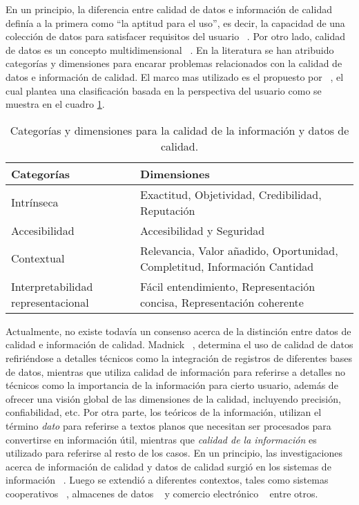 En un principio, la diferencia entre calidad de datos e informaci\'on de calidad defin\'ia a la primera como ``la aptitud para el uso'', es decir, la capacidad de una colecci\'on de datos para satisfacer requisitos del usuario  ~\cite{StroD:97, CappC:02}. Por otro lado, calidad de datos es un concepto multidimensional ~\cite{CappC:02}. En la literatura se han atribuido categor\'ias y dimensiones para encarar problemas relacionados con la calidad de datos e informaci\'on de calidad. El marco mas utilizado es el propuesto por ~\cite{StroD:97}, el cual plantea una clasificaci\'on basada en la perspectiva del usuario como se muestra en el cuadro \ref{table:tablacidc1}.

\begin{table}[h]
  \centering
   \renewcommand{\arraystretch}{2}
   \begin{tabular}{>{\arraybackslash}m{3cm} >{\arraybackslash}m{10cm}}
	   \hline
	   \textbf{Categor\'ias} & \textbf{Dimensiones} \\
	   \hline
	   Intr\'inseca & Exactitud, Objetividad, Credibilidad, Reputaci\'on \\
	   Accesibilidad & Accesibilidad y Seguridad  \\
	   Contextual &  Relevancia, Valor a\~nadido, Oportunidad, Completitud, Informaci\'on Cantidad \\
	   Interpretabilidad representacional & F\'acil entendimiento, Representaci\'on concisa, Representaci\'on coherente  \\
\hline
 \end{tabular}
\caption {Categor\'ias y dimensiones para la calidad de la informaci\'on y datos de calidad.}
\label{table:tablacidc1}
\end{table}

Actualmente, no existe todav\'ia un consenso acerca de la distinci\'on entre datos de calidad e informaci\'on de calidad. Madnick ~\cite{MadWanLeeZhu:09}, determina el uso de calidad de datos refiri\'endose a detalles t\'ecnicos como la integraci\'on de registros de diferentes bases de datos, mientras que utiliza calidad de informaci\'on para referirse a detalles no t\'ecnicos como la importancia de la informaci\'on para cierto usuario, adem\'as de ofrecer una visi\'on global de las dimensiones de la calidad, incluyendo precisi\'on, confiabilidad, etc. Por otra parte, los te\'oricos de la informaci\'on, utilizan el t\'ermino \emph{dato} para referirse a textos planos que necesitan ser procesados para convertirse en informaci\'on \'util, mientras que \emph{calidad de la informaci\'on} es utilizado para referirse al resto de los casos. En un principio, las investigaciones acerca de informaci\'on de calidad y datos de calidad surgi\'o en los sistemas de informaci\'on ~\cite{StroD:97, LeeY:02}. Luego se extendi\'o a diferentes contextos, tales como sistemas cooperativos ~\cite{FugM:02, MarC:02}, almacenes de datos ~\cite{Bouze:01, ZhuBu:02} y comercio electr\'onico ~\cite{KatSia:99} entre otros.

